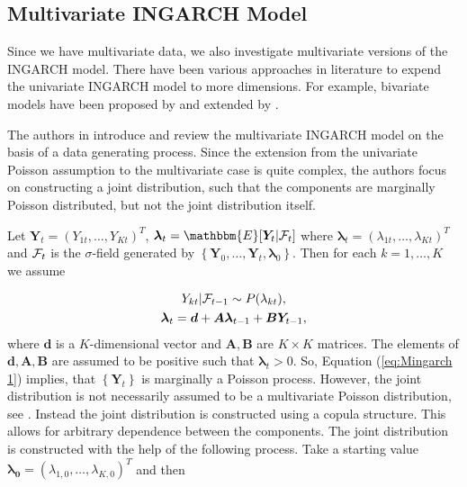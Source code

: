\subsection{Multivariate INGARCH Model}
\label{sec: Multivariate Ingarch}

Since we have multivariate data, we also investigate multivariate versions of the INGARCH model. There have been various approaches in literature to expend the univariate INGARCH model to more dimensions. For example, bivariate models have been proposed by \textcite{Liu:2012} and  extended by \textcite{Cui:2018}. 

The authors in \textcite{Fokianos:2020,Fokianos:2021} introduce and review the multivariate INGARCH model on the basis of a data generating process. Since the extension from the univariate Poisson assumption to the multivariate case is quite complex, the authors focus on constructing a joint distribution, such that the components are marginally Poisson distributed, but not the joint distribution itself. 

Let $\bm{Y}_t=(Y_{1t},\ldots,Y_{Kt})^T$, $\bm{\lambda}_t=\mathbbm{E}[\bm{Y}_t|\SigA_t]$ where $\bm{\lambda}_t = (\lambda_{1t},\ldots,\lambda_{Kt})^T$ and $\mathcal{F}_t$ is the $\sigma$-field generated by $\left\{\bm{Y}_0,\ldots,\bm{Y}_t,\bm{\lambda}_0\right\}$. Then for each $k=1,\ldots,K$ we assume

\begin{equation}
\begin{gathered}
Y_{kt} | \mathcal{F}_{t-1} \sim P(\lambda_{kt}), \\
\bm{\lambda}_t = \bm{d} + \bm{A}\bm{\lambda}_{t-1} + \bm{B}\bm{Y}_{t-1},
\label{eq:Mingarch 1}
\end{gathered}
\end{equation}
%
where $\bm{d}$ is a $K$-dimensional vector and $\bm{A},\bm{B}$ are $K\times K$ matrices. The elements of $\bm{d},\bm{A},\bm{B}$ are assumed to be positive such that $\bm{\lambda}_t > 0$. So, Equation (\ref{eq:Mingarch 1}) implies, that $\left\{\bm{Y}_t\right\}$ is marginally a Poisson process. However, the joint distribution is not necessarily assumed to be a multivariate Poisson distribution, see \textcite{Fokianos:2020}. Instead the joint distribution is constructed using a copula structure. This allows for arbitrary dependence between the components. The joint distribution is constructed with the help of the following process. Take a starting value $\bm{\lambda_0}=(\lambda_{1,0},\ldots,\lambda_{K,0})^T$ and then

